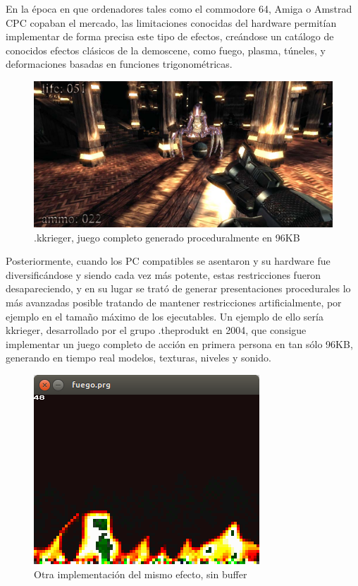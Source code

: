 \documentclass[a4,12pt]{article}
\begin{document}
En la época en que ordenadores tales como el commodore 64, Amiga o Amstrad CPC copaban el mercado, las limitaciones conocidas del hardware permitían implementar de forma precisa este tipo de efectos, creándose un catálogo de conocidos efectos clásicos de la demoscene, como fuego, plasma, túneles, y deformaciones basadas en funciones trigonométricas.
\newline
\newline
\begin{figure}[h!]
  \centering
    \includegraphics[scale=0.35]{img/kkrieger}
  \caption{.kkrieger, juego completo generado proceduralmente en 96KB}
\end{figure}
Posteriormente, cuando los PC compatibles se asentaron y su hardware fue diversificándose y siendo cada vez más potente, estas restricciones fueron desapareciendo, y en su lugar se trató de generar presentaciones procedurales lo más avanzadas posible tratando de mantener restricciones artificialmente, por ejemplo en el tamaño máximo de los ejecutables.
\newline
\newline
Un ejemplo de ello sería kkrieger, desarrollado por el grupo .theprodukt en 2004, que consigue implementar un juego completo de acción en primera persona en tan sólo 96KB, generando en tiempo real modelos, texturas, niveles y sonido.


\begin{figure}[h!]
  \centering
    \includegraphics{img/fuego}
  \caption{Otra implementación del mismo efecto, sin buffer}
\end{figure}
\end{document}
